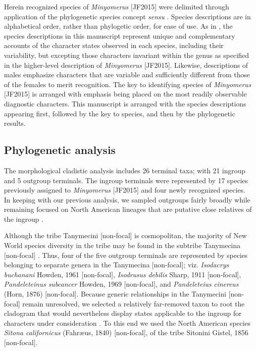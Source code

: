 \documentclass[fleqn,10pt,lineno]{wlpeerj} %
\begin{document}
		Herein recognized species of \textit{Minyomerus} [JF2015] were delimited through application of the phylogenetic species concept \textit{sensu} \citet{wheeler2000}.
		Species descriptions are in alphabetical order, rather than phylogetic order, for ease of use.
		As in \citet{jansen2015}, the species descriptions in this manuscript represent unique and complementary accounts of the character states observed in each species, including their variability, but excepting those characters invariant within the genus as specified in the higher-level description of \textit{Minyomerus} [JF2015].
		Likewise, descriptions of males emphasize characters that are variable and sufficiently different from those of the females to merit recognition.
		The key to identifying species of \textit{Minyomerus} [JF2015] is arranged with emphasis being placed on the most readily observable diagnostic characters.
				This manuscript is arranged with the species descriptions appearing first, followed by the key to species, and then by the phylogenetic results.
		
	\subsection*{Phylogenetic analysis}
		The morphological cladistic analysis includes 26 terminal taxa; with 21 ingroup and 5 outgroup terminals.
		The ingroup terminals were represented by 17 species previously assigned to \textit{Minyomerus} [JF2015] and four newly recognized species.
		In keeping with our previous analysis, we sampled outgroups fairly broadly while remaining focused on North American lineages that are putative close relatives of the ingroup \citep{jansen2015, nixon1993}.
		
		Although the tribe Tanymecini [non-focal] is cosmopolitan, the majority of New World species diversity in the tribe may be found in the subtribe Tanymecina [non-focal] \citep{alonso1999}.
		Thus, four of the five outgroup terminals are represented by species belonging to separate genera in the Tanymecina [non-focal]; viz. \textit{Isodacrys buchanani} Howden, 1961 [non-focal], \textit{Isodrusus debilis} Sharp, 1911 [non-focal], \textit{Pandeleteinus subcancer} Howden, 1969 [non-focal], and \textit{Pandeleteius cinereus} (Horn, 1876) [non-focal].
		Because generic relationships in the Tanymecini [non-focal] remain unresolved, we selected a relatively far-removed taxon to root the cladogram that would nevertheless display states applicable to the ingroup for characters under consideration \citep{rieppel2007, franz2014}.
		To this end we used the North American species \textit{Sitona californicus} (Fahr{\ae}us, 1840) [non-focal], of the tribe Sitonini Gistel, 1856 [non-focal].
		
\end{document}
